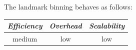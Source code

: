 %
%
%
The landmark binning behaves as follows:
\begin{center}
{\footnotesize
\begin{tabular}{ccc}
\emph{Efficiency} & \emph{Overhead} & \emph{Scalability} \\
\hline
medium &
low &
low
\end{tabular}
}
\end{center}

